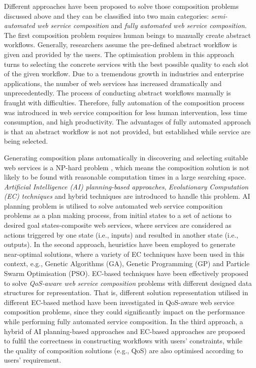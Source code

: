 Different approaches have been proposed to solve those composition problems discussed above and they can be classified into two main categories: \emph{semi-automated web service composition} and \emph{fully automated web service composition}. The first composition problem requires human beings to manually create abstract workflows. Generally, researchers assume the pre-defined abstract workflow is given and provided by the users. The optimisation problem in this approach turns to selecting the concrete services with the best possible quality to each slot of the given workflow. Due to a tremendous growth in industries and enterprise applications, the number of web services has increased dramatically and unprecedentedly. The process of conducting abstract workflows  manually is fraught with difficulties. Therefore, fully automation of the composition process was introduced in web service composition for less human intervention, less time consumption, and high productivity. The advantages of fully automated approach is that an abstract workflow is not not provided, but established while service are being selected. 


Generating composition plans automatically in discovering and selecting suitable web services is a NP-hard problem \cite{moghaddam2014service}, which means the composition solution is not likely to be found with reasonable computation times in a large searching space. \emph{Artificial Intelligence (AI) planning-based approaches}, \emph{Evolutionary Computation (EC) techniques} and hybrid techniques  are introduced to handle this problem. AI planning problem is utilised to solve automated web service composition problems as a plan making process, from initial states to a set of actions to desired goal states-composite web services, where services are considered as actions triggered by one state (i.e., inputs) and resulted in another state (i.e., outputs). In the second approach, heuristics have been employed to generate near-optimal solutions, where a variety of EC techniques have been used in this context, e.g., Genetic Algorithms (GA), Genetic Programming (GP) and Particle Swarm Optimisation (PSO). EC-based techniques have been effectively proposed to solve \emph{QoS-aware web service composition} problems with different designed data structures for representation. That is, different solution representation utilised in different EC-based method have been investigated in QoS-aware web service composition problems, since they could significantly impact on the performance while performing fully automated service composition. In the third approach, a hybrid of AI planning-based approaches and EC-based approaches are proposed to fulfil the correctness in constructing workflows with users' constraints, while the quality of composition solutions (e.g., QoS) are also optimised according to users' requirement.


